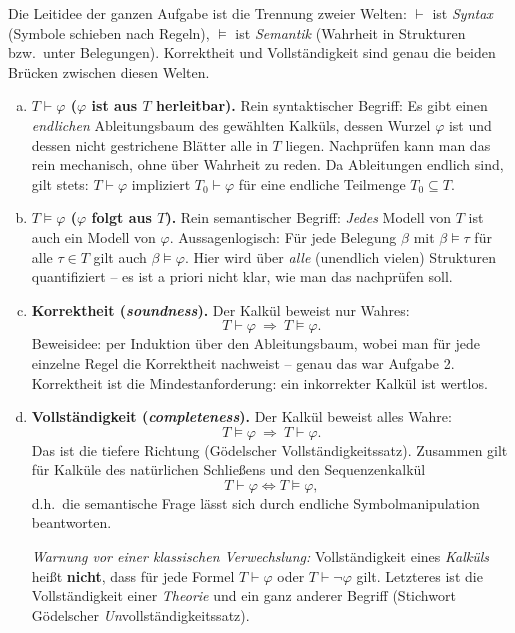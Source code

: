 \begin{loesung}
Die Leitidee der ganzen Aufgabe ist die Trennung zweier Welten: $\vdash$ ist \emph{Syntax} (Symbole schieben nach Regeln), $\models$ ist \emph{Semantik} (Wahrheit in Strukturen bzw.\ unter Belegungen). Korrektheit und Vollständigkeit sind genau die beiden Brücken zwischen diesen Welten.

\begin{enumerate}[a)]
  \item \textbf{$T\vdash\varphi$ (\glqq{}$\varphi$ ist aus $T$ herleitbar\grqq{}).} Rein syntaktischer Begriff: Es gibt einen \emph{endlichen} Ableitungsbaum des gewählten Kalküls, dessen Wurzel $\varphi$ ist und dessen nicht gestrichene Blätter alle in $T$ liegen. Nachprüfen kann man das rein mechanisch, ohne über Wahrheit zu reden. Da Ableitungen endlich sind, gilt stets: $T\vdash\varphi$ impliziert $T_0\vdash\varphi$ für eine endliche Teilmenge $T_0\subseteq T$.

  \item \textbf{$T\models\varphi$ (\glqq{}$\varphi$ folgt aus $T$\grqq{}).} Rein semantischer Begriff: \emph{Jedes} Modell von $T$ ist auch ein Modell von $\varphi$. Aussagenlogisch: Für jede Belegung $\beta$ mit $\beta\models\tau$ für alle $\tau\in T$ gilt auch $\beta\models\varphi$. Hier wird über \emph{alle} (unendlich vielen) Strukturen quantifiziert -- es ist a priori nicht klar, wie man das nachprüfen soll.

  \item \textbf{Korrektheit (\emph{soundness}).} Der Kalkül beweist nur Wahres:
  \[T\vdash\varphi\ \Longrightarrow\ T\models\varphi .\]
  Beweisidee: per Induktion über den Ableitungsbaum, wobei man für jede einzelne Regel die Korrektheit nachweist -- genau das war Aufgabe 2. Korrektheit ist die \glqq{}Mindestanforderung\grqq{}: ein inkorrekter Kalkül ist wertlos.

  \item \textbf{Vollständigkeit (\emph{completeness}).} Der Kalkül beweist alles Wahre:
  \[T\models\varphi\ \Longrightarrow\ T\vdash\varphi .\]
  Das ist die tiefere Richtung (Gödelscher Vollständigkeitssatz). Zusammen gilt für Kalküle des natürlichen Schließens und den Sequenzenkalkül
  \[T\vdash\varphi\iff T\models\varphi,\]
  d.h.\ die semantische Frage lässt sich durch endliche Symbolmanipulation beantworten.

  \emph{Warnung vor einer klassischen Verwechslung:} Vollständigkeit eines \emph{Kalküls} heißt \textbf{nicht}, dass für jede Formel $T\vdash\varphi$ oder $T\vdash\neg\varphi$ gilt. Letzteres ist die Vollständigkeit einer \emph{Theorie} und ein ganz anderer Begriff (Stichwort Gödelscher \emph{Un}vollständigkeitssatz).


\end{enumerate}
\end{loesung}
